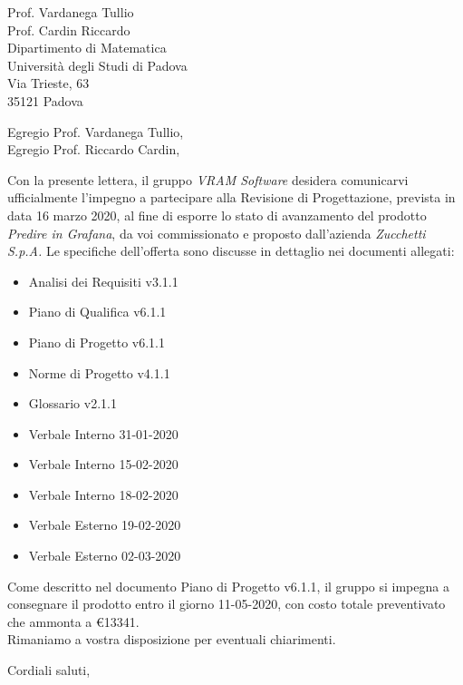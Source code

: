 \documentclass[a4paper,12pt]{letteracdp}
\date{09 marzo 2020}
\begin{document}
\begin{letter}{
		Prof. Vardanega Tullio \\
		Prof. Cardin Riccardo \\
		Dipartimento di Matematica \\
		Università degli Studi di Padova \\
		Via Trieste, 63 \\
		35121 Padova}
	
	\opening{Egregio Prof. Vardanega Tullio, \\ \noindent Egregio Prof. Riccardo Cardin,}
	
	\begin{flushleft}
	Con la presente lettera, il gruppo \textit{VRAM Software} desidera comunicarvi ufficialmente l'impegno a partecipare alla Revisione di Progettazione, prevista in data 16 marzo 2020, al fine di esporre lo stato di avanzamento del prodotto \textit{Predire in Grafana}, da voi commissionato e proposto dall'azienda \textit{Zucchetti S.p.A.}
	Le specifiche dell'offerta sono discusse in dettaglio nei documenti allegati:
	\end{flushleft}

	\begin{itemize}
		\item Analisi dei Requisiti v3.1.1
		\item Piano di Qualifica v6.1.1
		\item Piano di Progetto v6.1.1
		\item Norme di Progetto v4.1.1
		\item Glossario v2.1.1
		\item Verbale Interno 31-01-2020
		\item Verbale Interno 15-02-2020
		\item Verbale Interno 18-02-2020
		\item Verbale Esterno 19-02-2020
		\item Verbale Esterno 02-03-2020
	\end{itemize}

	\begin{flushleft}
	\noindent Come descritto nel documento Piano di Progetto v6.1.1, il gruppo si impegna a consegnare il prodotto entro il giorno 11-05-2020, con costo totale preventivato che ammonta a \euro{13341}.
	\\
	
	Rimaniamo a vostra disposizione per eventuali chiarimenti.
	\end{flushleft}

	\closing{Cordiali saluti,}
	
\end{letter}	
\end{document}
